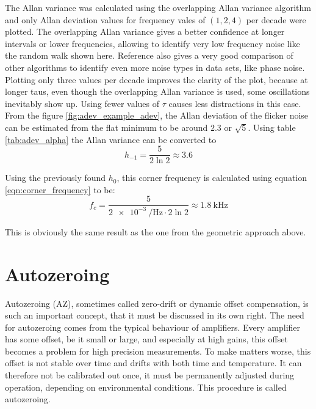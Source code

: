 The Allan variance was calculated using the overlapping Allan variance algorithm \cite{oadev_definition} and only Allan deviation values for frequency vales of $(1, 2, 4)$ per decade were plotted. The overlapping Allan variance gives a better confidence at longer intervals or lower frequencies, allowing to identify very low frequency noise like the random walk shown here. Reference \cite{oadev_definition} also gives a very good comparison of other algorithms to identify even more noise types in data sets, like phase noise. Plotting only three values per decade improves the clarity of the plot, because at longer taus, even though the overlapping Allan variance is used, some oscillations inevitably show up. Using fewer values of $\tau$ causes less distractions in this case.
From the figure \ref{fig:adev_example_adev}, the Allan deviation of the flicker noise can be estimated from the flat minimum to be around $2.3$ or $\sqrt{5}$. Using table \ref{tab:adev_alpha} the Allan variance can be converted to
\begin{equation}
    h_{-1} = \frac{5}{2 \ln 2} \approx 3.6 \nonumber
\end{equation}

Using the previously found $h_0$, this corner frequency is calculated using equation \ref{eqn:corner_frequency} to be:
\begin{equation}
    f_c = \frac{5}{\qty{2e-3}{\per \Hz} \cdot 2 \ln 2} \approx \qty{1.8}{\kHz} \nonumber
\end{equation}

This is obviously the same result as the one from the geometric approach above.

\clearpage
\section{Autozeroing}
\label{sec:autozero}
Autozeroing (AZ), sometimes called zero-drift or dynamic offset compensation, is such an important concept, that it must be discussed in its own right. The need for autozeroing comes from the typical behaviour of amplifiers. Every amplifier has some offset, be it small or large, and especially at high gains, this offset becomes a problem for high precision measurements. To make matters worse, this offset is not stable over time and drifts with both time and temperature. It can therefore not be calibrated out once, it must be permanently adjusted during operation, depending on environmental conditions. This procedure is called autozeroing.

